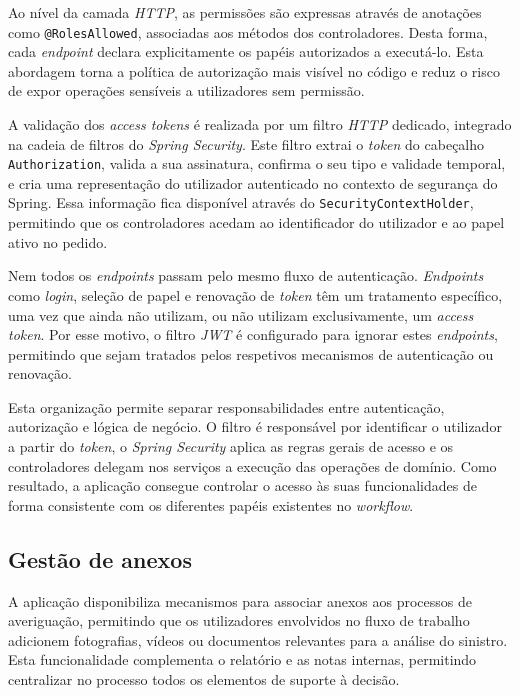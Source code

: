 Ao n\'{i}vel da camada \textit{HTTP}, as permiss\~{o}es s\~{a}o expressas atrav\'{e}s de anota\c{c}\~{o}es como \texttt{@RolesAllowed}, associadas aos m\'{e}todos dos controladores. Desta forma, cada \textit{endpoint} declara explicitamente os pap\'{e}is autorizados a execut\'{a}-lo. Esta abordagem torna a pol\'{i}tica de autoriza\c{c}\~{a}o mais vis\'{i}vel no c\'{o}digo e reduz o risco de expor opera\c{c}\~{o}es sens\'{i}veis a utilizadores sem permiss\~{a}o.

A valida\c{c}\~{a}o dos \textit{access tokens} \'{e} realizada por um filtro \textit{HTTP} dedicado, integrado na cadeia de filtros do \textit{Spring Security}. Este filtro extrai o \textit{token} do cabe\c{c}alho \texttt{Authorization}, valida a sua assinatura, confirma o seu tipo e validade temporal, e cria uma representa\c{c}\~{a}o do utilizador autenticado no contexto de seguran\c{c}a do Spring. Essa informa\c{c}\~{a}o fica dispon\'{i}vel atrav\'{e}s do \texttt{SecurityContextHolder}, permitindo que os controladores acedam ao identificador do utilizador e ao papel ativo no pedido.

Nem todos os \textit{endpoints} passam pelo mesmo fluxo de autentica\c{c}\~{a}o. \textit{Endpoints} como \textit{login}, sele\c{c}\~{a}o de papel e renova\c{c}\~{a}o de \textit{token} t\^{e}m um tratamento espec\'{i}fico, uma vez que ainda n\~{a}o utilizam, ou n\~{a}o utilizam exclusivamente, um \textit{access token}. Por esse motivo, o filtro \textit{JWT} \'{e} configurado para ignorar estes \textit{endpoints}, permitindo que sejam tratados pelos respetivos mecanismos de autentica\c{c}\~{a}o ou renova\c{c}\~{a}o.

Esta organiza\c{c}\~{a}o permite separar responsabilidades entre autentica\c{c}\~{a}o, autoriza\c{c}\~{a}o e l\'{o}gica de neg\'{o}cio. O filtro \'{e} respons\'{a}vel por identificar o utilizador a partir do \textit{token}, o \textit{Spring Security} aplica as regras gerais de acesso e os controladores delegam nos servi\c{c}os a execu\c{c}\~{a}o das opera\c{c}\~{o}es de dom\'{i}nio. Como resultado, a aplica\c{c}\~{a}o consegue controlar o acesso \`{a}s suas funcionalidades de forma consistente com os diferentes pap\'{e}is existentes no \textit{workflow}.


\subsection{Gest\~{a}o de anexos} \label{subsec:gestao-anexos}

A aplicação disponibiliza mecanismos para associar anexos aos processos de averiguação, permitindo que os utilizadores envolvidos no fluxo de trabalho adicionem fotografias, vídeos ou documentos relevantes para a análise do sinistro. Esta funcionalidade complementa o relatório e as notas internas, permitindo centralizar no processo todos os elementos de suporte à decisão.

